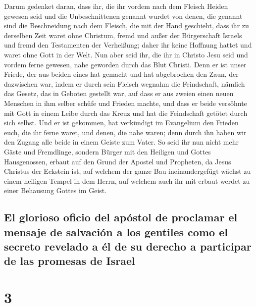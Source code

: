  Darum gedenket daran, dass ihr, die ihr vordem nach dem
Fleisch Heiden gewesen seid und die Unbeschnittenen genannt wurdet von
denen, die genannt sind die Beschneidung nach dem Fleisch, die mit der
Hand geschieht,  dass ihr zu derselben Zeit waret ohne
Christum, fremd und außer der Bürgerschaft Israels und fremd den
Testamenten der Verheißung; daher ihr keine Hoffnung hattet und waret
ohne Gott in der Welt.  Nun aber seid ihr, die ihr in
Christo Jesu seid und vordem ferne gewesen, nahe geworden durch das Blut
Christi.  Denn er ist unser Friede, der aus beiden eines
hat gemacht und hat abgebrochen den Zaun, der dazwischen war, indem er
durch sein Fleisch wegnahm die Feindschaft,  nämlich das
Gesetz, das in Geboten gestellt war, auf dass er aus zweien einen neuen
Menschen in ihm selber schüfe und Frieden machte,  und
dass er beide versöhnte mit Gott in einem Leibe durch das Kreuz und hat
die Feindschaft getötet durch sich selbst.  Und er ist
gekommen, hat verkündigt im Evangelium den Frieden euch, die ihr ferne
waret, und denen, die nahe waren;  denn durch ihn haben
wir den Zugang alle beide in einem Geiste zum Vater.  So
seid ihr nun nicht mehr Gäste und Fremdlinge, sondern Bürger mit den
Heiligen und Gottes Hausgenossen,  erbaut auf den Grund
der Apostel und Propheten, da Jesus Christus der Eckstein ist,
 auf welchem der ganze Bau ineinandergefügt wächst zu
einem heiligen Tempel in dem Herrn,  auf welchem auch ihr
mit erbaut werdet zu einer Behausung Gottes im Geist.

\hypertarget{el-glorioso-oficio-del-apuxf3stol-de-proclamar-el-mensaje-de-salvaciuxf3n-a-los-gentiles-como-el-secreto-revelado-a-uxe9l-de-su-derecho-a-participar-de-las-promesas-de-israel}{%
\subsection{El glorioso oficio del apóstol de proclamar el mensaje de
salvación a los gentiles como el secreto revelado a él de su derecho a
participar de las promesas de
Israel}\label{el-glorioso-oficio-del-apuxf3stol-de-proclamar-el-mensaje-de-salvaciuxf3n-a-los-gentiles-como-el-secreto-revelado-a-uxe9l-de-su-derecho-a-participar-de-las-promesas-de-israel}}

\hypertarget{section-2}{%
\section{3}\label{section-2}}

